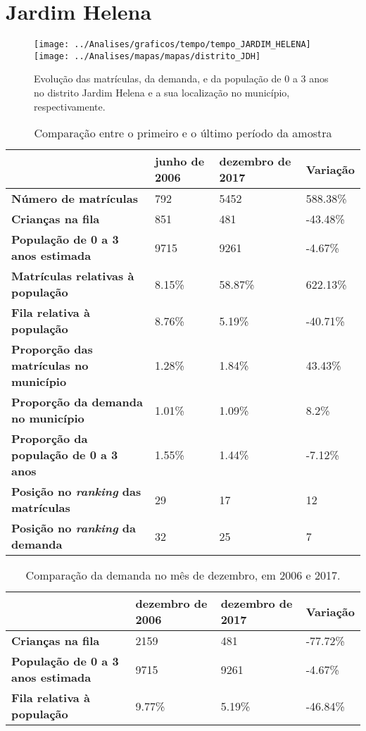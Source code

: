 \section{Jardim Helena}
\begin{figure}[H]
	\centering
	\texttt{[image: ../Analises/graficos/tempo/tempo\_JARDIM\_HELENA]}
	\texttt{[image: ../Analises/mapas/mapas/distrito\_JDH]}
	\caption{Evolução das matrículas, da demanda, e da população de 0 a 3 anos no distrito Jardim Helena e a sua localização no município, respectivamente.}
\end{figure}
\begin{table}[H]
	\begin{tabular}{|l|l|l|l|}
		\hline
		\textbf{}                                      & \textbf{junho de 2006}       & \textbf{dezembro de 2017}    & \textbf{Variação} \\ \hline
		\textbf{Número de matrículas}                  & 792 & 5452 & 588.38\% \\ \hline
		\textbf{Crianças na fila}                      & 851 & 481 & -43.48\% \\ \hline
		\textbf{População de 0 a 3 anos estimada}      & 9715 & 9261 & -4.67\% \\ \hline
		\textbf{Matrículas relativas à população}      & 8.15\% & 58.87\% & 622.13\% \\ \hline
		\textbf{Fila relativa à população}             & 8.76\% & 5.19\% & -40.71\% \\ \hline
		\textbf{Proporção das matrículas no município} & 1.28\% & 1.84\% & 43.43\% \\ \hline
		\textbf{Proporção da demanda no município}     & 1.01\% & 1.09\% & 8.2\% \\ \hline
		\textbf{Proporção da população de 0 a 3 anos}  & 1.55\% & 1.44\% & -7.12\% \\ \hline
		\textbf{Posição no \textit{ranking} das matrículas}     & 29 & 17 & 12 \\ \hline
		\textbf{Posição no \textit{ranking} da demanda}         & 32 & 25 & 7 \\ \hline
	\end{tabular}
	\caption{Comparação entre o primeiro e o último período da amostra}
\end{table}
\begin{table}[H]
	\begin{tabular}{|l|l|l|l|}
		\hline
		\textbf{}                                 & \textbf{dezembro de 2006} & \textbf{dezembro de 2017} & \textbf{Variação} \\ \hline
		\textbf{Crianças na fila}                      & 2159 & 481 & -77.72\% \\ \hline
		\textbf{População de 0 a 3 anos estimada}      & 9715 & 9261 & -4.67\% \\ \hline
		\textbf{Fila relativa à população}             & 9.77\% & 5.19\% & -46.84\% \\ \hline
	\end{tabular}
	\caption{Comparação da demanda no mês de dezembro, em 2006 e 2017.}
\end{table}
